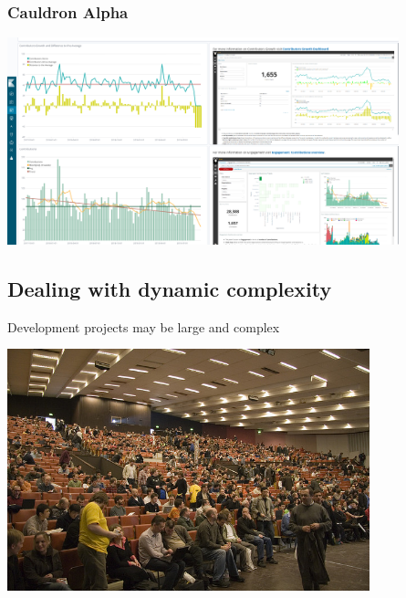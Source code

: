 \documentclass[17pt,aspectratio=169,hyperref=pdfusetitle]{beamer}
\begin{document}

\begin{frame}
\frametitle{Cauldron Alpha}

\begin{center}
\includegraphics[height=6cm]{figs/cauldron-kibana}
\end{center}

\end{frame}


\subsection{Dealing with dynamic complexity}


\begin{frame}
Development projects may be large and complex

\begin{center}
\includegraphics[height=7cm]{figs/fosdem-crowd}
\end{center}

\end{frame}
\end{document}
